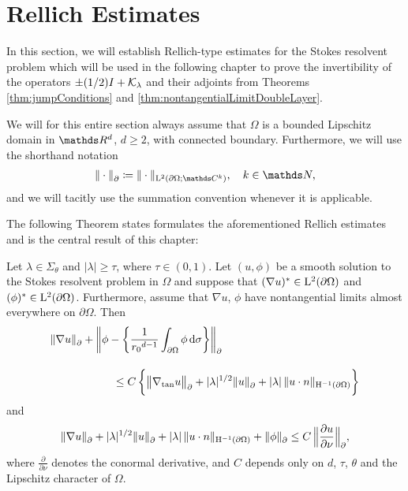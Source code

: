 \chapter{Rellich Estimates}
\label{chap:4}

In this section, we will establish Rellich-type estimates for the Stokes resolvent problem which will be used in the following chapter to prove the invertibility of the operators $\pm(1/2)I + \mathcal{K}_{\lambda}$ and their adjoints from Theorems  \ref{thm:jumpConditions} and \ref{thm:nontangentialLimitDoubleLayer}.

We will for this entire section always assume that $\Omega$ is a bounded Lipschitz domain in $\R^d$, $d \geq 2$, with connected boundary.
Furthermore, we will use the shorthand notation
\begin{align*}
    \| \cdot \|^{}_{\partial} \coloneqq \| \cdot \|_{\Ell^2(\partial\Omega; \C^k)}, \quad k \in \N,
\end{align*}
and we will tacitly use the summation convention whenever it is applicable.

The following Theorem states formulates the aforementioned Rellich estimates and is the central result of this chapter:

\begin{thm}
  \label{thm:rellich}
  Let $\lambda \in \Sigma_\theta$ and $|\lambda| \geq \tau$, where 
  $\tau \in (0,1)$.
  Let $(u,\phi)$ be a smooth solution to the Stokes resolvent problem in $\Omega$ and suppose that $(\nabla u)^* \in \mathrm{L}^2(\partial\Omega)$ and $(\phi)^* \in \mathrm{L}^2(\partial\Omega)$.
  Furthermore, assume that $\nabla u$, $\phi$ have nontangential limits almost everywhere on $\partial\Omega$.
  Then
  \begin{align}
    \label{eq:rellich1}
    \begin{alignedat}{1}
        &\|\nabla u\|^{}_\partial + \bigg\|\phi - \bigg\{ \frac{1}{{r_0}^{d - 1}}\int_{\partial\Omega} \phi \, {\operatorname{d}\!{\sigma}} \bigg\} \bigg\|^{}_\partial \\[1em]
      &\hspace{2cm} \leq C\, \bigg\{ \big\|\nabla_{\mathrm{tan}} u\big\|^{}_\partial + |\lambda|^{1/2} \|u\|^{}_\partial + |\lambda| \, \|u \cdot n\|_{\mathrm{H}^{-1}(\partial\Omega)} \bigg\}
    \end{alignedat}
  \end{align}
  and
  \begin{align}
    \label{eq:rellich2}
    \|\nabla u\|^{}_\partial + |\lambda|^{1/2} \|u\|^{}_\partial + |\lambda| \, \|u \cdot n\|_{\mathrm{H}^{-1}(\partial\Omega)} + \|\phi\|^{}_\partial
    \leq C \, \Big\|\frac{\partial u}{\partial \nu} \Big\|^{}_\partial,
  \end{align}
  where $\frac{\partial}{\partial \nu}$ denotes the conormal derivative, and $C$ depends only on $d$, $\tau$, $\theta$ and the Lipschitz character of $\Omega$.
\end{thm}


